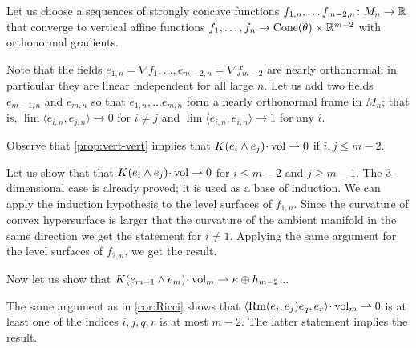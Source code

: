 Let us choose a sequences of strongly concave functions $f_{1,n},\dots f_{m-2,n}\colon M_n\to \mathbb{R}$ that converge to vertical affine functions $f_1,\dots,f_n\to \operatorname{Cone}(\theta)\times \mathbb{R}^{m-2}$ with orthonormal gradients.

Note that the fields $e_{1,n}=\nabla f_1,\dots,e_{m-2,n}=\nabla f_{m-2}$ are nearly orthonormal;
in particular they are linear independent for all large $n$.
Let us add two fields $e_{m-1,n}$ and $e_{m,n}$  so that $e_{1,n},\dots e_{m,n}$ form a nearly orthonormal frame in $M_n$;
that is, $\lim\langle e_{i,n}, e_{j,n}\rangle\to 0$ for $i\ne j$ and $\lim\langle e_{i,n}, e_{i,n}\rangle\to 1$ for any $i$.

Observe that \ref{prop:vert-vert} implies that $K(e_i\wedge e_j)\cdot\vol\rightharpoonup 0$ if $i,j\le m-2$.

Let us show that that $K(e_i\wedge e_j)\cdot\vol\rightharpoonup 0$ for $i\le m-2$ and $j\ge m-1$.
The $3$-dimensional case is already proved; it is used as a base of induction.
We can apply the induction hypothesis to the level surfaces of $f_{1,n}$.
Since the curvature of convex hypersurface is larger that the curvature of the ambient manifold in the same direction we get the statement for $i\ne 1$.
Applying the same argument for the level surfaces of $f_{2,n}$, we get the result.

Now let us show that $K(e_{m-1}\wedge e_m)\cdot\vol_m\rightharpoonup \kappa\oplus h_{m-2}$...

The same argument as in \ref{cor:Ricci} shows that $\langle\Rm(e_i,e_j)e_q,e_r\rangle\cdot\vol_m\rightharpoonup0$ is at least one of the indices $i,j,q,r$ is at most $m-2$.
The latter statement implies the result.
\qeds
